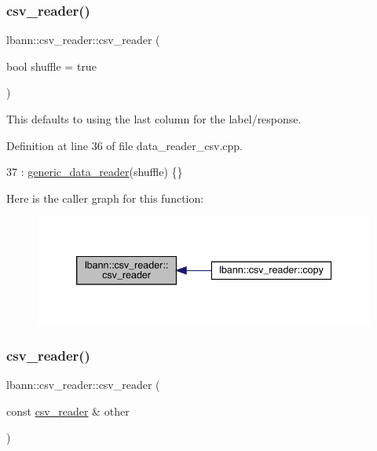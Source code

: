 \subsubsection{\texorpdfstring{csv\+\_\+reader()}{csv\_reader()}\hspace{0.1cm}{\footnotesize\ttfamily [1/2]}}
{\footnotesize\ttfamily lbann\+::csv\+\_\+reader\+::csv\+\_\+reader (\begin{DoxyParamCaption}\item[{bool}]{shuffle = {\ttfamily true} }\end{DoxyParamCaption})}

This defaults to using the last column for the label/response. 

Definition at line 36 of file data\+\_\+reader\+\_\+csv.\+cpp.


\begin{DoxyCode}
37   : \hyperlink{classlbann_1_1generic__data__reader_aaba933b8f7c1227801f6e80d39986af4}{generic\_data\_reader}(shuffle) \{\}
\end{DoxyCode}
Here is the caller graph for this function\+:\nopagebreak
\begin{figure}[H]
\begin{center}
\leavevmode
\includegraphics[width=339pt]{classlbann_1_1csv__reader_ac301a4c8e2ef029b65e8f6b8cbbc5855_icgraph}
\end{center}
\end{figure}
\mbox{\label{classlbann_1_1csv__reader_a6482322efe56d495bcea4df65ebf381a}} 
\subsubsection{\texorpdfstring{csv\+\_\+reader()}{csv\_reader()}\hspace{0.1cm}{\footnotesize\ttfamily [2/2]}}
{\footnotesize\ttfamily lbann\+::csv\+\_\+reader\+::csv\+\_\+reader (\begin{DoxyParamCaption}\item[{const \hyperlink{classlbann_1_1csv__reader}{csv\+\_\+reader} \&}]{other }\end{DoxyParamCaption})}




